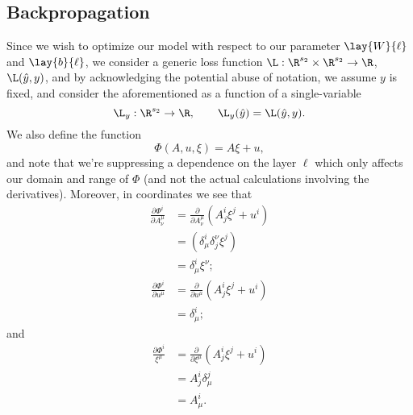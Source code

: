 \begin{comment}
Recalling that the gradient is the transpose of the exterior derivative in Euclidean space, we then conclude that
\begin{align*}
	\nabla F&=(dF)^T\\
	&=\left(\lay{dF}{2}+\lay{dF}{1}+\lay{dF}{0}\right)^T\\
	&=\nabla\lay{F}{2}+\nabla\lay{F}{1}+\nabla\lay{F}{0},
\end{align*}
and respectively,
\begin{align*}
	\nabla\lay{F}{2}&=\left(d(\L_y)_{\lay{a}{2}}\cdot d\lay{g}{2}_{\lay{z}{2}}\cdot d\lay{\phi}{2}_{(\lay{W}{2},\lay{b}{2},\{\lay{a}{1}\})}\right)^T
\end{align*}


\end{comment}

\subsection{Backpropagation}\label{sec:backPropDerivation}

Since we wish to optimize our model with respect to our parameter $\lay{W}{\ell}$ and $\lay{b}{\ell}$,  we consider a generic loss function $\L:\R^{s_2}\times\R^{s_2}\to\R$, $\L(\hat{y},y)$, and by acknowledging the potential abuse of notation, we assume $y$ is fixed, and consider the aforementioned as a function of a single-variable
$$\L_y:\R^{s_2}\to\R, \qquad \L_y(\hat{y})=\L(\hat{y},y).$$
We also define the function
$$\Phi(A,u,\xi)=A\xi+u,$$
and note that we're suppressing a dependence on the layer $\ell$ which only affects our domain and range of $\Phi$ (and not the actual calculations involving the derivatives).  Moreover, in coordinates we see that
\begin{align*}
	\frac{\partial\Phi^i}{\partial A^\mu_\nu}&=\frac{\partial}{\partial A^\mu_\nu}(A^i_j\xi^j+u^i)\\
	&=(\delta^i_\mu\delta_j^\nu \xi^j)\\
	&=\delta^i_\mu \xi^\nu;
\end{align*}
\begin{align*}
	\frac{\partial\Phi^i}{\partial u^\mu}&=\frac{\partial}{\partial u^\mu}(A^i_j\xi^j+u^i)\\
	&=\delta^i_\mu;
\end{align*}
and
\begin{align*}
	\frac{\partial\Phi^i}{\xi^\mu}&=\frac{\partial}{\partial \xi^\mu}(A^i_j\xi^j+u^i)\\
	&=A^i_j\delta^j_\mu\\
	&=A^i_\mu.
\end{align*}





